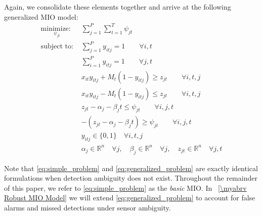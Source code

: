 Again, we consolidate these elements together and arrive at the following generalized MIO model:
\begin{align}
\underset{\psi_{jt}}{\text{minimize: }} & \sum_{j=1}^{P} \sum_{t=1}^{T} \psi_{jt} \label{eq:generalized_problem}\\
\text{subject to: }	& \sum_{j=1}^{P} y_{itj} = 1 \qquad \forall i,t\nonumber\\
				& \sum_{i=1}^{P} y_{itj} = 1 \qquad \forall j,t\nonumber\\
				& x_{it}y_{itj} + M_{t}(1-y_{itj}) \geq z_{jt} \qquad \forall i,t,j\nonumber\\
				& x_{it}y_{itj} - M_{t}(1-y_{itj}) \leq z_{jt} \qquad \forall i,t,j\nonumber\\
				& z_{jt} - \alpha_{j} - \beta_{j}t \leq \psi_{jt} \qquad \forall i,j,t\nonumber\\
				& -(z_{jt} - \alpha_{j} - \beta_{j}t) \geq \psi_{jt} \qquad \forall i,j,t\nonumber\\
			 	& y_{itj} \in \{0,1\} \quad \forall i,t,j\nonumber\\
				& \alpha_{j} \in \mathbb{R}^n \quad \forall j,\quad \beta_{j} \in \mathbb{R}^n \quad \forall j, \quad z_{jt} \in \mathbb{R}^n \quad \forall j,t\nonumber
\end{align}

Note that \eqref{eq:simple_problem} and \eqref{eq:generalized_problem} are exactly identical formulations when detection ambiguity does not exist. Throughout the remainder of this paper, we refer to \eqref{eq:simple_problem} as the \textit{basic} MIO. In \mysection~\ref{\myabrv Robust MIO Model} we will extend \eqref{eq:generalized_problem} to account for false alarms and missed detections under sensor ambiguity. 